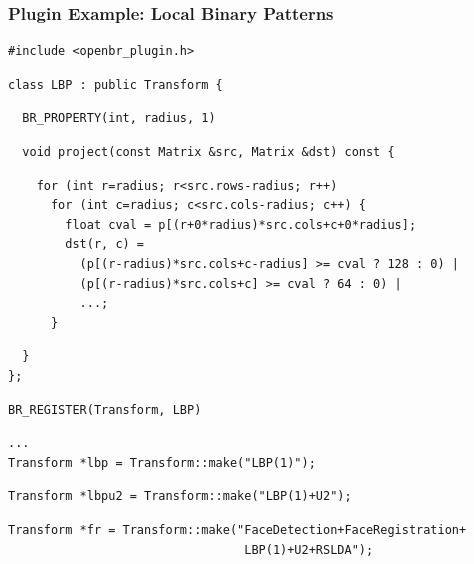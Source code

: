 \documentclass[12pt]{beamer}
\begin{document}
\begin{frame}[fragile]
\frametitle{Plugin Example: Local Binary Patterns}
{\footnotesize
\pause
\begin{verbatim}
#include <openbr_plugin.h>
\end{verbatim}
\vspace{-24pt}
\pause
\begin{verbatim}
class LBP : public Transform {
\end{verbatim}
\vspace{-24pt}
\pause
\begin{verbatim}
  BR_PROPERTY(int, radius, 1)
\end{verbatim}
\vspace{-24pt}
\pause
\begin{verbatim}
  void project(const Matrix &src, Matrix &dst) const {
\end{verbatim}
\vspace{-24pt}
\pause
\begin{verbatim}
    for (int r=radius; r<src.rows-radius; r++)
      for (int c=radius; c<src.cols-radius; c++) {
        float cval = p[(r+0*radius)*src.cols+c+0*radius];
        dst(r, c) =
          (p[(r-radius)*src.cols+c-radius] >= cval ? 128 : 0) |
          (p[(r-radius)*src.cols+c] >= cval ? 64 : 0) |
          ...;
      }
\end{verbatim}
\vspace{-24pt}
\pause
\begin{verbatim}
  }
};
\end{verbatim}
\vspace{-24pt}
\pause
\begin{verbatim}
BR_REGISTER(Transform, LBP)
\end{verbatim}
\vspace{-24pt}
\pause
\begin{verbatim}
...
Transform *lbp = Transform::make("LBP(1)");
\end{verbatim}
\vspace{-24pt}
\pause
\begin{verbatim}
Transform *lbpu2 = Transform::make("LBP(1)+U2");
\end{verbatim}
\vspace{-24pt}
\pause
\begin{verbatim}
Transform *fr = Transform::make("FaceDetection+FaceRegistration+
                                 LBP(1)+U2+RSLDA");
\end{verbatim}
}
\end{frame}
\end{document}
